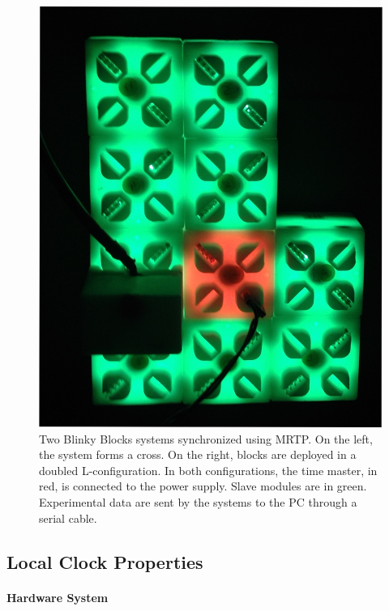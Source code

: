 {\begin{figure}[!h]
\begin{center}
		\includegraphics[width=\ImgWidth,height=\ImgHeight]{images/time-synchronization/L.png}
	\end{center}
	\caption{Two Blinky Blocks systems synchronized using MRTP. On the left, the system forms a cross. On the right, blocks are deployed in a doubled L-configuration. In both configurations, the time master, in red, is connected to the power supply. Slave modules are in green. Experimental data are sent by the systems to the PC through a serial cable.\label{fig:time-sync:mrtp-blinkyblocks}}
\end{figure}
}

\subsection{Local Clock Properties}

\paragraph{Hardware System}


